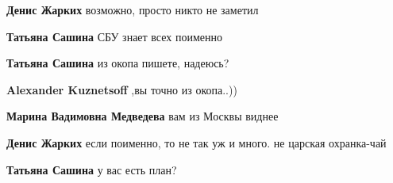 \begin{itemize}
\begin{itemize}
\textbf{Денис Жарких} возможно, просто никто не заметил

 
\textbf{Татьяна Сашина} СБУ знает всех поименно

 
\textbf{Татьяна Сашина} из окопа пишете, надеюсь?

 
\textbf{Alexander Kuznetsoff} ,вы точно из окопа..))

 
\textbf{Марина Вадимовна Медведева} вам из Москвы виднее

 
\textbf{Денис Жарких} если поименно, то не так уж и много. не царская охранка-чай

 
\textbf{Татьяна Сашина} у вас есть план?

 

\end{itemize}
\end{itemize}
